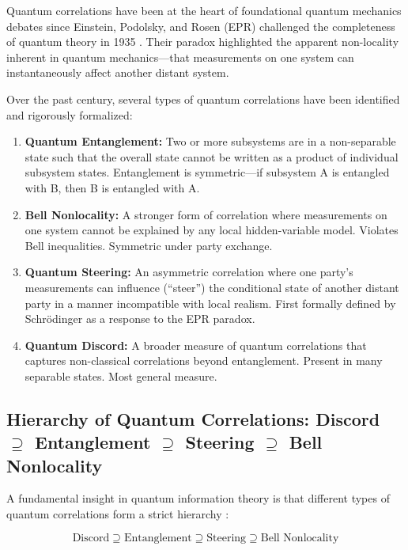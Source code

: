 Quantum correlations have been at the heart of foundational quantum mechanics debates since Einstein, Podolsky, and Rosen (EPR) challenged the completeness of quantum theory in 1935 \cite{einsteinPodolskyRosen1935}. Their paradox highlighted the apparent non-locality inherent in quantum mechanics—that measurements on one system can instantaneously affect another distant system.

Over the past century, several types of quantum correlations have been identified and rigorously formalized:

\begin{enumerate}
	\item \textbf{Quantum Entanglement:} Two or more subsystems are in a non-separable state such that the overall state cannot be written as a product of individual subsystem states. Entanglement is symmetric—if subsystem A is entangled with B, then B is entangled with A.

	\item \textbf{Bell Nonlocality:} A stronger form of correlation where measurements on one system cannot be explained by any local hidden-variable model. Violates Bell inequalities. Symmetric under party exchange.

	\item \textbf{Quantum Steering:} An asymmetric correlation where one party's measurements can influence (``steer'') the conditional state of another distant party in a manner incompatible with local realism. First formally defined by Schrödinger \cite{schrodingerDiscussion1935} as a response to the EPR paradox.

	\item \textbf{Quantum Discord:} A broader measure of quantum correlations that captures non-classical correlations beyond entanglement. Present in many separable states. Most general measure.
\end{enumerate}

\subsection{Hierarchy of Quantum Correlations: Discord $\supseteq$ Entanglement $\supseteq$ Steering $\supseteq$ Bell Nonlocality}

A fundamental insight in quantum information theory is that different types of quantum correlations form a strict hierarchy \cite{brunnerBellNonlocality2014}:

\begin{equation}
\text{Discord} \supseteq \text{Entanglement} \supseteq \text{Steering} \supseteq \text{Bell Nonlocality}
\end{equation}

